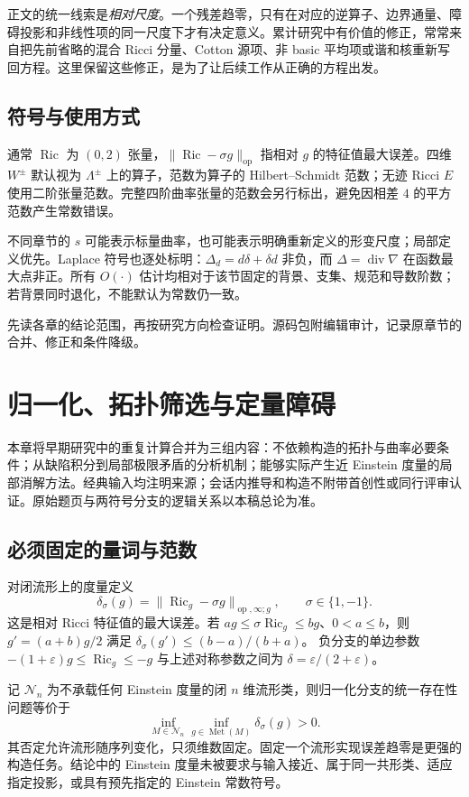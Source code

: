 \documentclass[UTF8,fontset=fandol,zihao=-4,oneside,openany]{ctexbook}
\theoremstyle{cjkplain}
\numberwithin{equation}{chapter}
\DeclareMathOperator{\Ric}{Ric}
\begin{document}
正文的统一线索是\emph{相对尺度}。一个残差趋零，只有在对应的逆算子、边界通量、障碍投影和非线性项的同一尺度下才有决定意义。累计研究中有价值的修正，常常来自把先前省略的混合 Ricci 分量、Cotton 源项、非 basic 平均项或谐和核重新写回方程。这里保留这些修正，是为了让后续工作从正确的方程出发。

\section*{符号与使用方式}
通常 $\Ric$ 为 $(0,2)$ 张量，$\|\Ric-\sigma g\|_{\mathrm{op}}$ 指相对 $g$ 的特征值最大误差。四维 $W^\pm$ 默认视为 $\Lambda^\pm$ 上的算子，范数为算子的 Hilbert--Schmidt 范数；无迹 Ricci $E$ 使用二阶张量范数。完整四阶曲率张量的范数会另行标出，避免因相差 $4$ 的平方范数产生常数错误。

不同章节的 $s$ 可能表示标量曲率，也可能表示明确重新定义的形变尺度；局部定义优先。Laplace 符号也逐处标明：$\Delta_d=d\delta+\delta d$ 非负，而 $\Delta=\operatorname{div}\nabla$ 在函数最大点非正。所有 $O(\cdot)$ 估计均相对于该节固定的背景、支集、规范和导数阶数；若背景同时退化，不能默认为常数仍一致。

先读各章的结论范围，再按研究方向检查证明。源码包附编辑审计，记录原章节的合并、修正和条件降级。

\tableofcontents
\mainmatter


\chapter{归一化、拓扑筛选与定量障碍}\label{FND:chapter}
本章将早期研究中的重复计算合并为三组内容：不依赖构造的拓扑与曲率必要条件；从缺陷积分到局部极限矛盾的分析机制；能够实际产生近 Einstein 度量的局部消解方法。经典输入均注明来源；会话内推导和构造不附带首创性或同行评审认证。原始题页与两符号分支的逻辑关系以本稿总论为准。

\section{必须固定的量词与范数}
对闭流形上的度量定义
\[
\delta_\sigma(g)=\|\Ric_g-\sigma g\|_{\operatorname{op},\infty;g},
\qquad \sigma\in\{1,-1\}.
\]
这是相对 Ricci 特征值的最大误差。若
\(ag\le \sigma\Ric_g\le bg\)、\(0<a\le b\)，则
\(g'=(a+b)g/2\) 满足
\(\delta_\sigma(g')\le(b-a)/(b+a)\)。
负分支的单边参数
\(-(1+\varepsilon)g\le\Ric_g\le-g\) 与上述对称参数之间为
\(\delta=\varepsilon/(2+\varepsilon)\)。

记 \(\mathcal N_n\) 为不承载任何 Einstein 度量的闭 \(n\) 维流形类，则归一化分支的统一存在性问题等价于
\[
\inf_{M\in\mathcal N_n}\inf_{g\in\operatorname{Met}(M)}
\delta_\sigma(g)>0.
\]
其否定允许流形随序列变化，只须维数固定。固定一个流形实现误差趋零是更强的构造任务。结论中的 Einstein 度量未被要求与输入接近、属于同一共形类、适应指定投影，或具有预先指定的 Einstein 常数符号。
\end{document}

